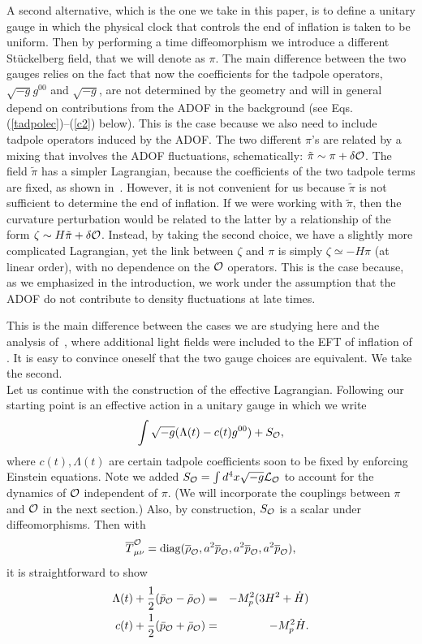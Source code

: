 \documentclass[11pt,amsmath,floats,floatfix,nofootinbib,secnumarabic, superscriptaddress, tightenlines]{revtex4}
\newcommand{\beq}{\begin{equation}}
\newcommand{\eeq}{\end{equation}}
\newcommand{\bea}{\begin{eqnarray}}
\newcommand{\eea}{\end{eqnarray}}
\newcommand{\calo}{{\cal O}}
\newcommand{\calL}{{\cal L}}
\begin{document}
{A second alternative, which is the one we take in this paper, is to define a unitary gauge in which the physical clock that controls the end of inflation is taken to be uniform. Then by performing a time diffeomorphism we introduce a different St\"uckelberg field, that we will denote as $\pi$. The main difference between the two gauges relies on the fact that now the coefficients for the tadpole operators, $\sqrt{-g} g^{00}$ and $\sqrt{-g}$, are not determined by the geometry and will in general depend on contributions from the ADOF in the background (see Eqs. (\ref{tadpolec})--(\ref{c2}) below). This is the case because we also need to include tadpole operators induced by the ADOF. The two different $\pi$'s are related by a mixing that involves the ADOF fluctuations, schematically: $\tilde\pi\sim \pi+\delta\calo$. The field $\tilde \pi$ has a simpler Lagrangian, because the coefficients of the two tadpole terms are fixed, as shown in~\cite{eft1}. However, it is not convenient for us because $\tilde\pi$ is not sufficient to determine the end of inflation. If we were working with $\tilde \pi$, then the curvature perturbation would be related to the latter by a relationship of the form $\zeta\sim H\tilde\pi+\delta \calo$. Instead, by taking the second choice, we have a slightly more complicated Lagrangian, yet the link between $\zeta$ and $\pi$ is simply $\zeta\simeq -H\pi$ (at linear order), with no dependence on the $\calo$ operators. This is the case because, as we emphasized in the introduction, we work under the assumption that the ADOF do not contribute to density fluctuations at late times. 

This is the main difference between the cases we are studying here and the analysis of~\cite{multieft}, where additional light fields were included to the EFT of inflation of \cite{eft1}. It is easy to convince oneself that the two gauge choices are equivalent. We take the second.\\

Let us continue with the construction of the effective Lagrangian. Following \cite{eft1} our starting point is an effective action in a unitary gauge in which we write 
\bea
\label{tadpolec}
\int \sqrt{-g} (\Lambda(t) - c(t) g^{00}) + S_{\calo},
\eea	
where $c(t),\Lambda(t)$ are certain tadpole coefficients soon to be fixed by enforcing Einstein equations. Note we added $S_{\calo} = \int d^4x\sqrt{-g}\calL_\calo$ to account for the dynamics of $\calo$ independent of $\pi$. (We will incorporate the couplings between $\pi$ and $\calo$ in the next section.) Also, by construction, $S_\calo$ is a scalar under diffeomorphisms. Then with
\beq
\label{tmno}
\overline{T}^{\calo}_{\mu\nu}=\mathrm{diag}(\overline{\rho}_\calo,a^2 \overline{p}_\calo,a^2 \overline{p}_\calo,a^2 \overline{p}_\calo),
\eeq
it is straightforward to show
\bea
\label{lambt}
\Lambda(t) + \frac{1}{2} (\bar p_\calo-\bar \rho_{\calo}) &=& - M_p^2(3H^2+\dot H) \\
c(t) + \frac{1}{2} (\bar p_\calo+\bar \rho_{\calo}) &=& -M_p^2\dot H \label{c2}.
\eea

}
\end{document}
